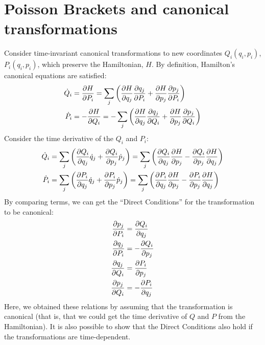 \section{Poisson Brackets and canonical transformations}
Consider time-invariant canonical transformations to new coordinates $Q_i(q_i,p_i)$, $P_i(q_i,p_i)$, which preserve the Hamiltonian, $H$. By definition, Hamilton's canonical equations are satisfied:
\begin{align}
\dot Q_i&=\frac{\partial H}{\partial P_i}=\sum_j\left( \frac{\partial H}{\partial q_j}\frac{\partial q_j}{\partial P_i}+\frac{\partial H}{\partial p_j}\frac{\partial p_j}{\partial P_i} \right)\nonumber\\
\dot P_i&=-\frac{\partial H}{\partial Q_i}=-\sum_j\left( \frac{\partial H}{\partial q_j}\frac{\partial q_j}{\partial Q_i}+\frac{\partial H}{\partial p_j}\frac{\partial p_j}{\partial Q_i} \right)\nonumber
\end{align}
Consider the time derivative of the $Q_i$ and $P_i$:
\begin{align}
\dot Q_i&=\sum_j\left(\frac{\partial Q_i}{\partial q_j}\dot q_j+\frac{\partial Q_i}{\partial p_j}\dot p_j\right)=\sum_j\left(\frac{\partial Q_i}{\partial q_j}\frac{\partial H}{\partial p_j}-\frac{\partial Q_i}{\partial p_j}\frac{\partial H}{\partial q_j}\right)\nonumber\\
\dot P_i&=\sum_j \left(\frac{\partial P_i}{\partial q_j}\dot q_j+\frac{\partial P_i}{\partial p_j}\dot p_j\right)=\sum_j \left(\frac{\partial P_i}{\partial q_j}\frac{\partial H}{\partial p_j}-\frac{\partial P_i}{\partial p_j}\frac{\partial H}{\partial q_j}\right)
\end{align}
By comparing terms, we can get the ``Direct Conditions'' for the transformation to be canonical:
\begin{align}
\frac{\partial p_j}{\partial P_i}&=\frac{\partial Q_i}{\partial q_j}\nonumber\\
\frac{\partial q_j}{\partial P_i}&=-\frac{\partial Q_i}{\partial p_j}\nonumber\\
\frac{\partial q_j}{\partial Q_i}&=\frac{\partial P_i}{\partial p_j}\nonumber\\
\frac{\partial p_j}{\partial Q_i}&=-\frac{\partial P_i}{\partial q_j}\nonumber
\end{align}
Here, we obtained these relations by assuming that the transformation is canonical (that is, that we could get the time derivative of $Q$ and $P$ from the Hamiltonian). It is also possible to show that the Direct Conditions also hold if the transformations are time-dependent.

